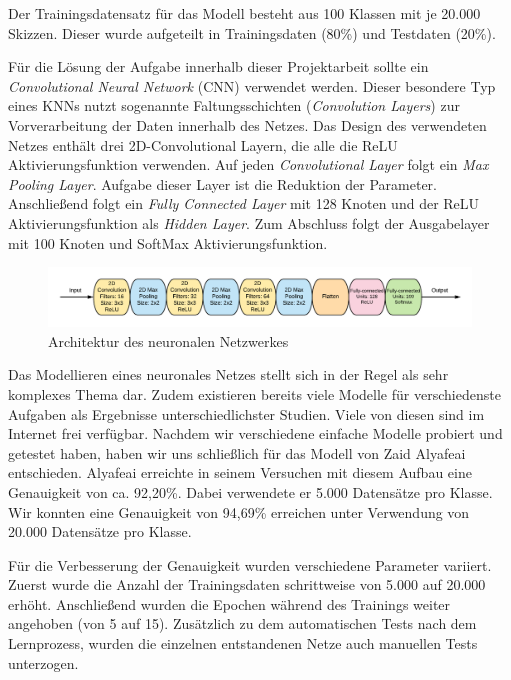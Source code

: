 \documentclass[11pt]{article}
\begin{document}
Der Trainingsdatensatz für das Modell besteht aus 100 Klassen mit je 20.000 Skizzen. Dieser wurde aufgeteilt in Trainingsdaten (80\%) und Testdaten (20\%).

Für die Lösung der Aufgabe innerhalb dieser Projektarbeit sollte  ein \textit{Convolutional Neural Network} (CNN) verwendet werden. Dieser besondere Typ eines KNNs nutzt sogenannte Faltungsschichten (\textit{Convolution Layers}) zur Vorverarbeitung der Daten innerhalb des Netzes.
Das Design des verwendeten Netzes enthält drei 2D-Convolutional Layern, die alle die ReLU Aktivierungsfunktion verwenden. Auf jeden \textit{Convolutional Layer} folgt ein \textit{Max Pooling Layer}. Aufgabe dieser Layer ist die Reduktion der Parameter. Anschließend folgt ein \textit{Fully Connected Layer} mit 128 Knoten und der ReLU Aktivierungsfunktion als \textit{Hidden Layer}. Zum Abschluss folgt der Ausgabelayer mit 100 Knoten und SoftMax Aktivierungsfunktion.

\begin{figure}[ht]
\centering
\includegraphics[width=1\textwidth]{images/NetworkArchitecture1.png}
\caption{\label{fig:classDiagram}Architektur des neuronalen Netzwerkes}
\end{figure}

Das Modellieren eines neuronales Netzes stellt sich in der Regel als sehr komplexes Thema dar. Zudem existieren bereits viele Modelle für verschiedenste Aufgaben als Ergebnisse unterschiedlichster Studien. Viele von diesen sind im Internet frei verfügbar. Nachdem wir verschiedene einfache Modelle probiert und getestet haben, haben wir uns schließlich für das Modell von Zaid Alyafeai\parencite{ZaidAlyafeai2018} entschieden. Alyafeai erreichte in seinem Versuchen mit diesem Aufbau eine Genauigkeit von ca. 92,20\%. Dabei verwendete er 5.000 Datensätze pro Klasse. Wir konnten eine Genauigkeit von   94,69\% erreichen unter Verwendung von 20.000 Datensätze pro Klasse.

Für die Verbesserung der Genauigkeit wurden verschiedene Parameter variiert. Zuerst wurde die Anzahl der Trainingsdaten schrittweise von 5.000 auf 20.000 erhöht. Anschließend wurden die Epochen während des Trainings weiter angehoben (von 5 auf 15). 
Zusätzlich zu dem automatischen Tests nach dem Lernprozess, wurden die einzelnen entstandenen Netze auch manuellen Tests unterzogen.
\end{document}
